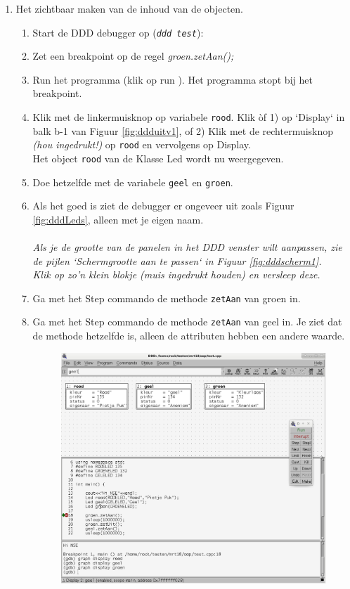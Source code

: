 \begin{enumerate} [label=\alph*]
\begin{enumerate} [label=\roman*]
\end{enumerate}
\newpage
\item Het zichtbaar maken van de inhoud van de objecten.


\begin{enumerate} [label=\roman*]
	\item Start de DDD debugger op (\texttt{\textit{ddd test}}):
		\item Zet een breakpoint op de regel	\textit{groen.zetAan();} 
		\item Run het programma (klik op run ). Het programma stopt bij het breakpoint.
		\item Klik met de linkermuisknop op variabele \texttt{rood}. Klik òf 1) op `Display` in balk b-1 van Figuur \ref{fig:ddduitv1}, of 2) Klik met de rechtermuisknop \textit{(hou ingedrukt!)} op \texttt{rood} en vervolgens op Display. \\Het object \texttt{rood} van de Klasse Led wordt nu weergegeven.
		\item Doe hetzelfde met de variabele \texttt{geel} en \texttt{groen}.
		\item Als het goed is ziet de debugger er ongeveer uit zoals Figuur \ref{fig:dddLeds}, alleen met je \textcolor{BrickRed}{eigen naam}.\\\\
		\emph{Als je de grootte van de panelen in het DDD venster wilt aanpassen, zie de pijlen `\textit{Schermgrootte aan te passen}` in Figuur \ref{fig:dddscherm1}.\\Klik op zo'n klein blokje (muis ingedrukt houden) en versleep deze.}
	    \item Ga met het Step commando de methode \texttt{zetAan} van groen in.
		\item Ga met het Step commando de methode \texttt{zetAan} van geel in. Je ziet dat de methode hetzelfde is, alleen de attributen hebben een andere waarde.
		  \begin{figure}[h!]
		 	\captionsetup{justification=centering}
		 	\includegraphics[width=0.9 \linewidth]{figuren/LedDDD}

\end{figure}
\end{enumerate}
\end{enumerate}
